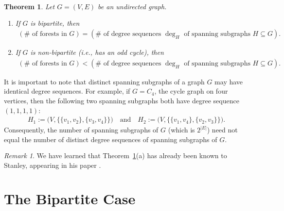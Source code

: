 \documentclass[12pt]{article}
\newtheorem{theorem}{Theorem}[section]
\theoremstyle{definition}
\theoremstyle{remark}
\newtheorem*{remark}{Remark}
\newcommand{\abs}[1]{\left| #1 \right|}
\begin{document}
\begin{framed}
\begin{theorem}\label{maintheorem}
   Let $G=(V,E)$ be an undirected graph.
   \begin{enumerate}
       \item[(a)] If $G$ is bipartite, then \begin{align*}
        (\# \text{ of forests in $G$}) =(\# \text{ of degree sequences $\deg_H$ of spanning subgraphs $H \subseteq G$}).
    \end{align*}
    \item[(b)] If $G$ is non-bipartite (i.e., has an odd cycle\footnotemark), then \begin{align*}
        (\# \text{ of forests in $G$}) <(\# \text{ of degree sequences $\deg_H$ of spanning subgraphs $H \subseteq G$}).
        \end{align*}
   \end{enumerate}
\end{theorem} 
\end{framed} 


It is important to note that distinct spanning subgraphs of a graph $G$ may have identical degree sequences. For example, if $G=C_4$, the cycle graph on four vertices, then the following two spanning subgraphs both have degree sequence $(1,1,1,1)$:
\begin{align*}
    H_1 := \Big(V, \big\{ \{v_1,v_2\},\{v_3,v_4\}\big\}\Big) \quad \text{and} \quad H_2 := \Big(V,\big\{\{v_1,v_4\},\{v_2,v_3\} \big\}\Big).
\end{align*}
Consequently, the number of spanning subgraphs of $G$ (which is $2^{\abs{E}}$) need not equal the number of distinct degree sequences of spanning subgraphs of $G$.

\begin{remark}
We have learned that Theorem~\ref{maintheorem}(a) has already been known to Stanley, appearing in his paper \cite[Corollary 5.4, last sentence]{Stanley1991}.
\end{remark}

\section{The Bipartite Case}\label{sec:bipart}
\end{document}
